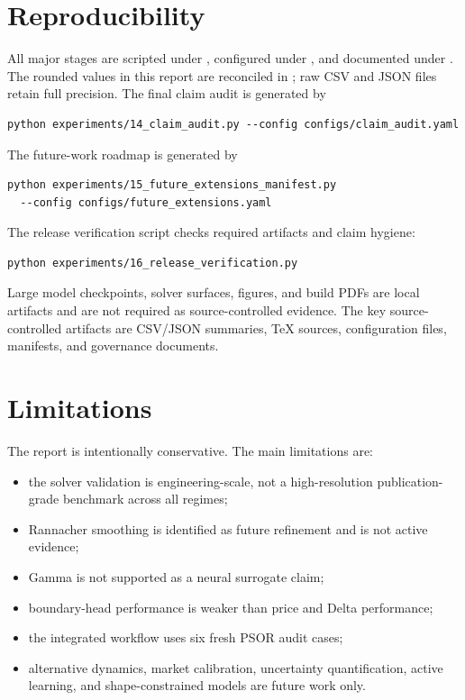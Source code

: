 \documentclass[11pt]{article}
\begin{document}


\section{Reproducibility}
All major stages are scripted under , configured under
, and documented under . The rounded values in
this report are reconciled in
; raw CSV and JSON files retain full
precision. The final claim audit is generated by
\begin{verbatim}
python experiments/14_claim_audit.py --config configs/claim_audit.yaml
\end{verbatim}
The future-work roadmap is generated by
\begin{verbatim}
python experiments/15_future_extensions_manifest.py
  --config configs/future_extensions.yaml
\end{verbatim}
The release verification script checks required artifacts and claim hygiene:
\begin{verbatim}
python experiments/16_release_verification.py
\end{verbatim}

Large model checkpoints, solver surfaces, figures, and build PDFs are local
artifacts and are not required as source-controlled evidence. The key
source-controlled artifacts are CSV/JSON summaries, TeX sources, configuration
files, manifests, and governance documents.

\section{Limitations}
The report is intentionally conservative. The main limitations are:
\begin{itemize}
  \item the solver validation is engineering-scale, not a high-resolution publication-grade benchmark across all regimes;
  \item Rannacher smoothing is identified as future refinement and is not active evidence;
  \item Gamma is not supported as a neural surrogate claim;
  \item boundary-head performance is weaker than price and Delta performance;
  \item the integrated workflow uses six fresh PSOR audit cases;
  \item alternative dynamics, market calibration, uncertainty quantification, active learning, and shape-constrained models are future work only.
\end{itemize}
\end{document}
